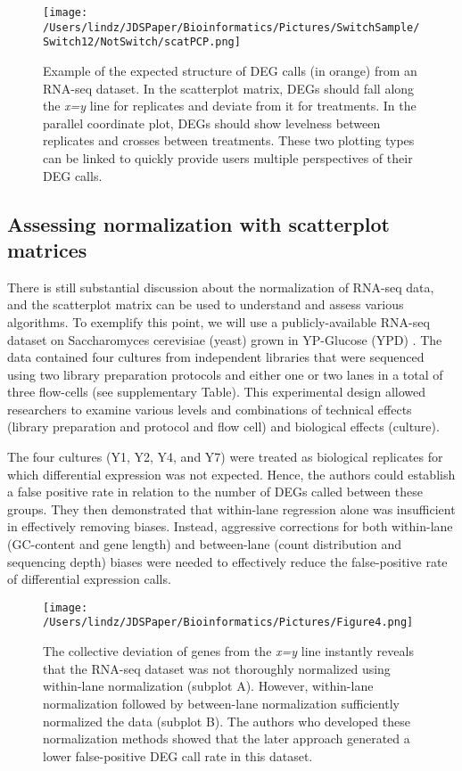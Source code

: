 \documentclass{bioinfo}
\begin{document}
\begin{figure}[!tpb]
\centerline{\texttt{[image: /Users/lindz/JDSPaper/Bioinformatics/Pictures/SwitchSample/Switch12/NotSwitch/scatPCP.png]}}
\caption{Example of the expected structure of DEG calls (in orange) from an RNA-seq dataset. In the scatterplot matrix, DEGs should fall along the \textit{x=y} line for replicates and deviate from it for treatments. In the parallel coordinate plot, DEGs should show levelness between replicates and crosses between treatments. These two plotting types can be linked to quickly provide users multiple perspectives of their DEG calls.
\label{scatPCP}}
\end{figure}

\subsection{Assessing normalization with scatterplot matrices}

There is still substantial discussion about the normalization of RNA-seq data, and the scatterplot matrix can be used to understand and assess various algorithms. To exemplify this point, we will use a publicly-available RNA-seq dataset on Saccharomyces cerevisiae (yeast) grown in YP-Glucose (YPD) \citep{Risso}. The data contained four cultures from independent libraries that were sequenced using two library preparation protocols and either one or two lanes in a total of three flow-cells (see supplementary Table). This experimental design allowed researchers to examine various levels and combinations of technical effects (library preparation and protocol and flow cell) and biological effects (culture).

The four cultures (Y1, Y2, Y4, and Y7) were treated as biological replicates for which differential expression was not expected. Hence, the authors could establish a false positive rate in relation to the number of DEGs called between these groups. They then demonstrated that within-lane regression alone was insufficient in effectively removing biases. Instead, aggressive corrections for both within-lane (GC-content and gene length) and between-lane (count distribution and sequencing depth) biases were needed to effectively reduce the false-positive rate of differential expression calls.

\begin{figure}[!tpb]
\centerline{\texttt{[image: /Users/lindz/JDSPaper/Bioinformatics/Pictures/Figure4.png]}}
\caption{The collective deviation of genes from the \textit{x=y} line instantly reveals that the RNA-seq dataset was not thoroughly normalized using within-lane normalization (subplot A). However, within-lane normalization followed by between-lane normalization sufficiently normalized the data (subplot B). The authors who developed these normalization methods showed that the later approach generated a lower false-positive DEG call rate in this dataset.
\label{withinbtwn}}
\end{figure}
\end{document}

